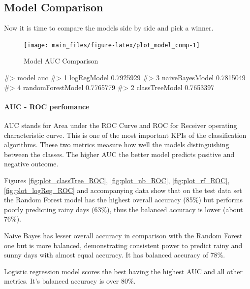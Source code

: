 \hypertarget{model-comparison}{%
\subsection{Model Comparison}\label{model-comparison}}

Now it is time to compare the models side by side and pick a winner.

\begin{Schunk}
\begin{figure}[H]

{\centering \texttt{[image: main\_files/figure-latex/plot\_model\_comp-1]} 

}

\caption[Model AUC Comparison]{Model AUC Comparison}\label{fig:plot_model_comp}
\end{figure}
\begin{Soutput}
#>               model       auc
#> 1       logRegModel 0.7925929
#> 3   naiveBayesModel 0.7815049
#> 4 randomForestModel 0.7765779
#> 2    classTreeModel 0.7653397
\end{Soutput}
\end{Schunk}

\hypertarget{auc---roc-perfomance}{%
\paragraph{AUC - ROC perfomance}\label{auc---roc-perfomance}}

AUC stands for Area under the ROC Curve and ROC for Receiver operating
characteristic curve. This is one of the most important KPIs of the
classification algorithms. These two metrics measure how well the models
distinguishing between the classes. The higher AUC the better model
predicts positive and negative outcome.

Figures \ref{fig:plot_classTree_ROC}, \ref{fig:plot_nb_ROC},
\ref{fig:plot_rf_ROC}, \ref{fig:plot_logReg_ROC} and accompanying data
show that on the test data set the Random Forest model has the highest
overall accuracy (85\%) but performs poorly predicting rainy days
(63\%), thus the balanced accuracy is lower (about 76\%).

Naive Bayes has lesser overall accuracy in comparison with the Random
Forest one but is more balanced, demonstrating consistent power to
predict rainy and sunny days with almost equal accuracy. It has balanced
accuracy of 78\%.

Logistic regression model scores the best having the highest AUC and all
other metrics. It's balanced accuracy is over 80\%.

